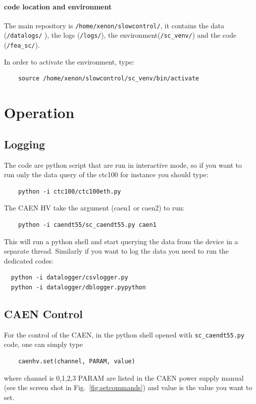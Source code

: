 \documentclass{article}
\begin{document}
\paragraph{code location and environment}
The main repository is \verb|/home/xenon/slowcontrol/|, it contains the data (\verb |/datalogs/| ), the logs (\verb |/logs/|), the environment(\verb |/sc_venv/|)  and the code (\verb |/fea_sc/|). 

In order to activate the environment, type: \begin{verbatim}
    source /home/xenon/slowcontrol/sc_venv/bin/activate
\end{verbatim}

\section{Operation}
\subsection{Logging}
The code are python script that are run in interactive mode, so if you want to run only the data query of the  ctc100 for instance you should type:
\begin{verbatim}
    python -i ctc100/ctc100eth.py
\end{verbatim}
The CAEN HV take the argument (caen1 or caen2) to run:
\begin{verbatim}
    python -i caendt55/sc_caendt55.py caen1
\end{verbatim}
This will run a python shell and start querying the data from the device in a separate thread.
Similarly if you want to log the data you need to run the dedicated codes:
\begin{verbatim}
  python -i datalogger/csvlogger.py 
  python -i datalogger/dblogger.pypython 
\end{verbatim}

\subsection{CAEN Control}
For the control of the CAEN, in the python shell opened with \verb|sc_caendt55.py| code,  one can simply type 
\begin{verbatim}
    caenhv.set(channel, PARAM, value)
\end{verbatim}
where channel is 0,1,2,3 PARAM are listed in the CAEN power supply manual (see the screen shot in Fig.~\ref{fig:setcommands}) and value is the value you want to set.
\end{document}
